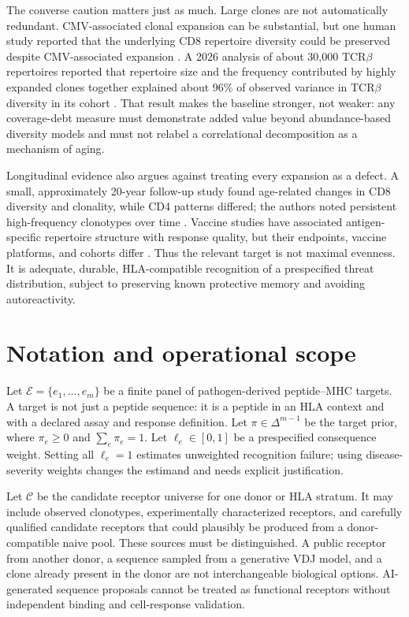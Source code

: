 \documentclass[11pt]{article}
\begin{document}
The converse caution matters just as much. Large clones are not automatically redundant. CMV-associated clonal expansion can be substantial, but one human study reported that the underlying CD8 repertoire diversity could be preserved despite CMV-associated expansion \citep{Lindau2019}. A 2026 analysis of about 30,000 TCR$\beta$ repertoires reported that repertoire size and the frequency contributed by highly expanded clones together explained about 96\% of observed variance in TCR$\beta$ diversity in its cohort \citep{Zahid2026}. That result makes the baseline stronger, not weaker: any coverage-debt measure must demonstrate added value beyond abundance-based diversity models and must not relabel a correlational decomposition as a mechanism of aging.

Longitudinal evidence also argues against treating every expansion as a defect. A small, approximately 20-year follow-up study found age-related changes in CD8 diversity and clonality, while CD4 patterns differed; the authors noted persistent high-frequency clonotypes over time \citep{Yoshida2017}. Vaccine studies have associated antigen-specific repertoire structure with response quality, but their endpoints, vaccine platforms, and cohorts differ \citep{Saggau2022}. Thus the relevant target is not maximal evenness. It is adequate, durable, HLA-compatible recognition of a prespecified threat distribution, subject to preserving known protective memory and avoiding autoreactivity.

\section{Notation and operational scope}
Let $\mathcal{E}=\{e_1,\ldots,e_m\}$ be a finite panel of pathogen-derived peptide--MHC targets. A target is not just a peptide sequence: it is a peptide in an HLA context and with a declared assay and response definition. Let $\pi\in\Delta^{m-1}$ be the target prior, where $\pi_e\geq0$ and $\sum_e\pi_e=1$. Let $\ell_e\in[0,1]$ be a prespecified consequence weight. Setting all $\ell_e=1$ estimates unweighted recognition failure; using disease-severity weights changes the estimand and needs explicit justification.

Let $\mathcal{C}$ be the candidate receptor universe for one donor or HLA stratum. It may include observed clonotypes, experimentally characterized receptors, and carefully qualified candidate receptors that could plausibly be produced from a donor-compatible naive pool. These sources must be distinguished. A public receptor from another donor, a sequence sampled from a generative VDJ model, and a clone already present in the donor are not interchangeable biological options. AI-generated sequence proposals cannot be treated as functional receptors without independent binding and cell-response validation.
\end{document}
